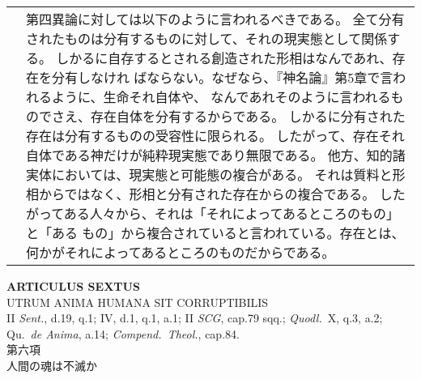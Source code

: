 \documentclass[10pt]{jsarticle} %
\begin{document}
\begin{longtable}{p{21em}p{21em}}
&

第四異論に対しては以下のように言われるべきである。
全て分有されたものは分有するものに対して、それの現実態として関係する。
しかるに自存するとされる創造された形相はなんであれ、存在を分有しなけれ
 ばならない。なぜなら、『神名論』第5章で言われるように、生命それ自体や、
 なんであれそのように言われるものでさえ、存在自体を分有するからである。
しかるに分有された存在は分有するものの受容性に限られる。
したがって、存在それ自体である神だけが純粋現実態であり無限である。
他方、知的諸実体においては、現実態と可能態の複合がある。
それは質料と形相からではなく、形相と分有された存在からの複合である。
したがってある人々から、それは「それによってあるところのもの」と「ある
もの」から複合されていると言われている。存在とは、何かがそれによってあるところのものだからである。

\end{longtable}
\newpage




\begin{center}
{\Large {\bf ARTICULUS SEXTUS}}\\
{\large UTRUM ANIMA HUMANA SIT CORRUPTIBILIS}\\
{\footnotesize II {\itshape Sent.}, d.19, q.1; IV, d.1, q.1, a.1;
 II {\itshape SCG}, cap.79 sqq.; {\itshape Quodl.}~X, q.3, a.2;
 Qu.~{\itshape de Anima}, a.14; {\itshape Compend.~Theol.}, cap.84.}\\
{\Large 第六項\\人間の魂は不滅か}
\end{center}
\end{document}

